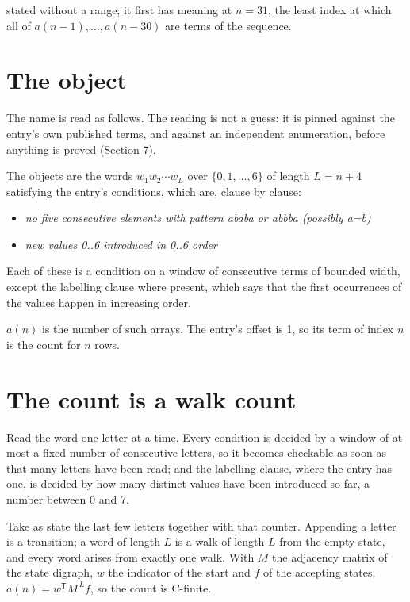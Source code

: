 \documentclass[11pt]{article}
\theoremstyle{definition}
\begin{document}
stated without a range; it first has meaning at $n = 31$, the least index at which all of $a(n-1),\dots,a(n-30)$ are terms of the sequence.

\section{The object}

The name is read as follows. The reading is not a guess: it is pinned against the entry's own published terms, and against an independent enumeration, before anything is proved (Section 7).

The objects are the words $w_1 w_2 \cdots w_L$ over $\{0,1,\dots,6\}$ of length $L = n + 4$ satisfying the entry's conditions, which are, clause by clause:

\begin{itemize}

\item {\itshape no five consecutive elements with pattern ababa or abbba (possibly a=b)}

\item {\itshape new values 0..6 introduced in 0..6 order}

\end{itemize}

Each of these is a condition on a window of consecutive terms of bounded width, except the labelling clause where present, which says that the first occurrences of the values happen in increasing order.

$a(n)$ is the number of such arrays. The entry's offset is 1, so its term of index $n$ is the count for $n$ rows.

\section{The count is a walk count}

Read the word one letter at a time. Every condition is decided by a window of at most a fixed number of consecutive letters, so it becomes checkable as soon as that many letters have been read; and the labelling clause, where the entry has one, is decided by how many distinct values have been introduced so far, a number between $0$ and 7.

Take as state the last few letters together with that counter. Appending a letter is a transition; a word of length $L$ is a walk of length $L$ from the empty state, and every word arises from exactly one walk. With $M$ the adjacency matrix of the state digraph, $w$ the indicator of the start and $f$ of the accepting states, $a(n) = w^{\mathsf T}M^{\,L}f$, so the count is C-finite.
\end{document}
